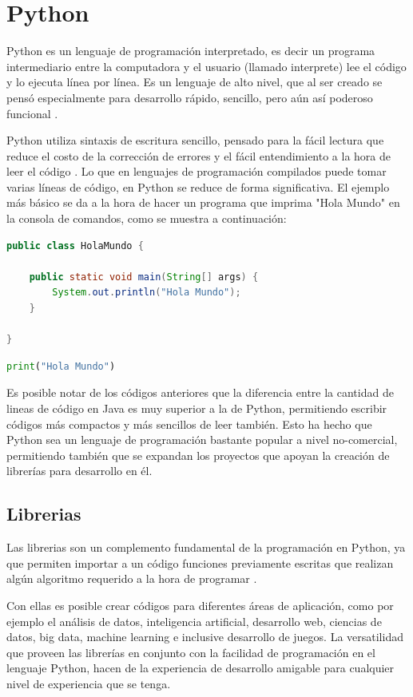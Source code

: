 \section{Python}
Python es un lenguaje de programación interpretado, es decir un programa intermediario entre la computadora y el usuario (llamado interprete) lee el código y lo ejecuta línea por línea. Es un lenguaje de alto nivel, que al ser creado se pensó especialmente para desarrollo rápido, sencillo, pero aún así poderoso funcional \cite{van1995python}.
\par
Python utiliza sintaxis de escritura sencillo, pensado para la fácil lectura que reduce el costo de la corrección de errores y el fácil entendimiento a la hora de leer el código \cite{van1995python}. Lo que en lenguajes de programación compilados puede tomar varias líneas de código, en Python se reduce de forma significativa. El ejemplo más básico se da a la hora de hacer un programa que imprima "Hola Mundo" en la consola de comandos, como se muestra a continuación:

\begin{lstlisting}[language=Java,frame=single,caption=Código del Hola Mundo en Java, inputencoding=latin1]
public class HolaMundo {

	public static void main(String[] args) {		
		System.out.println("Hola Mundo");
	}

}
\end{lstlisting}
\begin{lstlisting}[language=Python,frame=single,caption=Código del Hola Mundo en Python, inputencoding=latin1]
print("Hola Mundo")
\end{lstlisting}

\par
Es posible notar de los códigos anteriores que la diferencia entre la cantidad de lineas de código en Java es muy superior a la de Python, permitiendo escribir códigos más compactos y más sencillos de leer también. Esto ha hecho que Python sea un lenguaje de programación bastante popular a nivel no-comercial, permitiendo también que se expandan los proyectos que apoyan la creación de librerías para desarrollo en él.


\subsection{Librerias}
\par
Las librerias son un complemento fundamental de la programación en Python, ya que permiten importar a un código funciones previamente escritas que realizan algún algoritmo requerido a la hora de programar \cite{van1995python}.
\par
Con ellas es posible crear códigos para diferentes áreas de aplicación, como por ejemplo el análisis de datos, inteligencia artificial, desarrollo web, ciencias de datos, big data, machine learning e inclusive desarrollo de juegos. La versatilidad que proveen las librerías en conjunto con la facilidad de programación en el lenguaje Python, hacen de la experiencia de desarrollo amigable para cualquier nivel de experiencia que se tenga.


